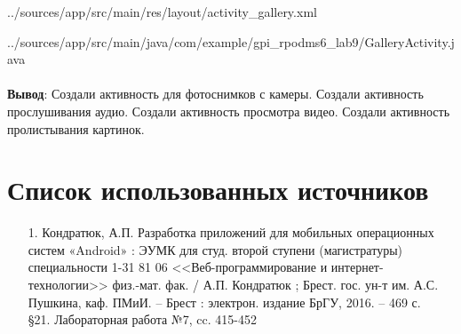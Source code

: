 \documentclass[12pt, a4paper, simple]{eskdtext}
\begin{document}
    
    {../sources/app/src/main/res/layout/activity_gallery.xml}

    
    {../sources/app/src/main/java/com/example/gpi_rpodms6_lab9/GalleryActivity.java}


    \paragraph{} \textbf{Вывод}:
    Создали активность для фотоснимков с камеры.
    Создали активность прослушивания аудио.
    Создали активность просмотра видео.
    Создали активность пролистывания картинок.

    \section*{Список использованных источников}
    \begin{enumerate}
        \item[1.] Кондратюк, А.П. Разработка приложений для мобильных операционных систем «Android» :
        ЭУМК для студ. второй ступени (магистратуры) специальности 1-31 81 06 <<Веб-программирование и интернет-технологии>>
        физ.-мат. фак. / А.П. Кондратюк ; Брест. гос. ун-т им. А.С. Пушкина, каф. ПМиИ. – Брест :
        электрон. издание БрГУ, 2016. – 469 с.\\
        §21. Лабораторная работа №7, cc. 415-452
    \end{enumerate}
    \newpage
\end{document}
